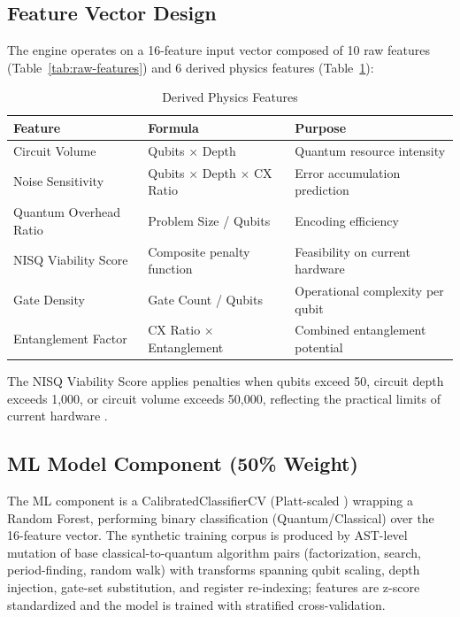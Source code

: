 \documentclass[10pt,conference]{IEEEtran}
\begin{document}
\subsection{Feature Vector Design}

The engine operates on a 16-feature input vector composed of 10 raw features (Table~\ref{tab:raw-features}) and 6 derived physics features (Table~\ref{tab:derived-features}):

\begin{table}[htbp]
\caption{Derived Physics Features}
\label{tab:derived-features}
\centering
\footnotesize
\begin{tabular}{p{} p{} p{}}
\toprule
\textbf{Feature} & \textbf{Formula} & \textbf{Purpose} \\
\midrule
Circuit Volume & Qubits $\times$ Depth & Quantum resource intensity \\
Noise Sensitivity & Qubits $\times$ Depth $\times$ CX Ratio & Error accumulation prediction \\
Quantum Overhead Ratio & Problem Size / Qubits & Encoding efficiency \\
NISQ Viability Score & Composite penalty function & Feasibility on current hardware \\
Gate Density & Gate Count / Qubits & Operational complexity per qubit \\
Entanglement Factor & CX Ratio $\times$ Entanglement & Combined entanglement potential \\
\bottomrule
\end{tabular}
\end{table}

The NISQ Viability Score applies penalties when qubits exceed 50, circuit depth exceeds 1,000, or circuit volume exceeds 50,000, reflecting the practical limits of current hardware \cite{vinkhuijzen2023}.

\subsection{ML Model Component (50\% Weight)}

The ML component is a CalibratedClassifierCV (Platt-scaled \cite{simsek2023}) wrapping a Random Forest, performing binary classification (Quantum/Classical) over the 16-feature vector. The synthetic training corpus is produced by AST-level mutation of base classical-to-quantum algorithm pairs (factorization, search, period-finding, random walk) with transforms spanning qubit scaling, depth injection, gate-set substitution, and register re-indexing; features are z-score standardized and the model is trained with stratified cross-validation.
\end{document}
